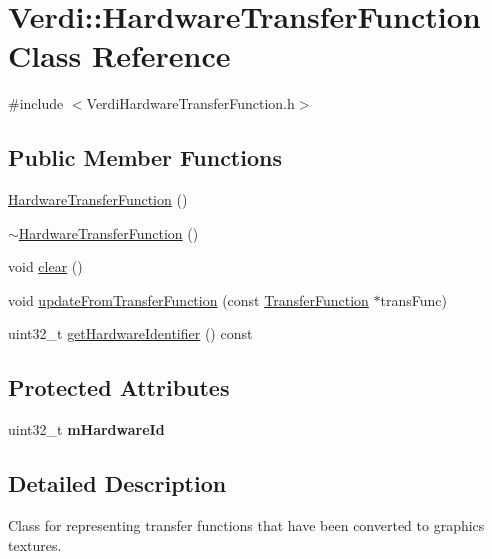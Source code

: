 \hypertarget{class_verdi_1_1_hardware_transfer_function}{\section{\-Verdi\-:\-:\-Hardware\-Transfer\-Function \-Class \-Reference}
\label{class_verdi_1_1_hardware_transfer_function}
}


{\ttfamily \#include $<$\-Verdi\-Hardware\-Transfer\-Function.\-h$>$}

\subsection*{\-Public \-Member \-Functions}
\begin{DoxyCompactItemize}
\item 
\hyperlink{class_verdi_1_1_hardware_transfer_function_aecc8ac88c6a759aea1eb58f7525d072a}{\-Hardware\-Transfer\-Function} ()
\item 
\hyperlink{class_verdi_1_1_hardware_transfer_function_a0c743bff2ab77e46188b0444842578da}{$\sim$\-Hardware\-Transfer\-Function} ()
\item 
void \hyperlink{class_verdi_1_1_hardware_transfer_function_afb8094162766e52e45a23c80420fd0a8}{clear} ()
\item 
void \hyperlink{class_verdi_1_1_hardware_transfer_function_a8fc5b46dbaf216d652884f3a12535933}{update\-From\-Transfer\-Function} (const \hyperlink{class_verdi_1_1_transfer_function}{\-Transfer\-Function} $\ast$trans\-Func)
\item 
uint32\-\_\-t \hyperlink{class_verdi_1_1_hardware_transfer_function_a6b358411f3395fdd206e1f139dc8fbe2}{get\-Hardware\-Identifier} () const 
\end{DoxyCompactItemize}
\subsection*{\-Protected \-Attributes}
\begin{DoxyCompactItemize}
\item 
\hypertarget{class_verdi_1_1_hardware_transfer_function_a6a15477f025217ebf5b3416d387495d0}{uint32\-\_\-t {\bfseries m\-Hardware\-Id}}\label{class_verdi_1_1_hardware_transfer_function_a6a15477f025217ebf5b3416d387495d0}

\end{DoxyCompactItemize}


\subsection{\-Detailed \-Description}
\-Class for representing transfer functions that have been converted to graphics textures. 

